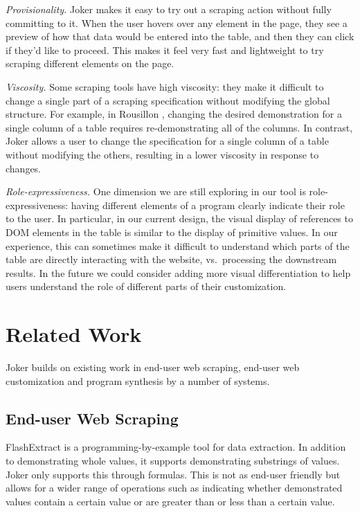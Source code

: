 \documentclass[sigconf,10pt]{acmart}
\begin{document}
\emph{Provisionality.} Joker makes it easy to try out a scraping action
without fully committing to it. When the user hovers over any element in
the page, they see a preview of how that data would be entered into the
table, and then they can click if they'd like to proceed. This makes it
feel very fast and lightweight to try scraping different elements on the
page.

\emph{Viscosity.} Some scraping tools have high viscosity: they make it
difficult to change a single part of a scraping specification without
modifying the global structure. For example, in Rousillon
\citep{chasins2018}, changing the desired demonstration for a single
column of a table requires re-demonstrating all of the columns. In
contrast, Joker allows a user to change the specification for a single
column of a table without modifying the others, resulting in a lower
viscosity in response to changes.

\emph{Role-expressiveness.} One dimension we are still exploring in our
tool is role-expressiveness: having different elements of a program
clearly indicate their role to the user. In particular, in our current
design, the visual display of references to DOM elements in the table is
similar to the display of primitive values. In our experience, this can
sometimes make it difficult to understand which parts of the table are
directly interacting with the website, vs.~processing the downstream
results. In the future we could consider adding more visual
differentiation to help users understand the role of different parts of
their customization.

\hypertarget{sec:related-work}{%
\section{Related Work}\label{sec:related-work}}

Joker builds on existing work in end-user web scraping, end-user web
customization and program synthesis by a number of systems.

\hypertarget{end-user-web-scraping}{%
\subsection{End-user Web Scraping}\label{end-user-web-scraping}}

FlashExtract \citep{le2014} is a programming-by-example tool for data
extraction. In addition to demonstrating whole values, it supports
demonstrating substrings of values. Joker only supports this through
formulas. This is not as end-user friendly but allows for a wider range
of operations such as indicating whether demonstrated values contain a
certain value or are greater than or less than a certain value.
\end{document}
